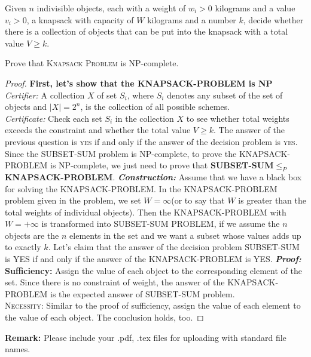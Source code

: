 \documentclass[12pt,a4paper]{article}
\theoremstyle{definition}
\begin{document}
\begin{enumerate}
        Given $n$ indivisible objects, each with a weight of $w_i>0$ kilograms and a value $v_i>0$, a knapsack with capacity of $W$ kilograms and a number $k$, decide whether there is a collection of objects that can be put into the knapsack with a total value $V\geqslant k$.
        
    Prove that \textsc{Knapsack Problem} is NP-complete.
    \begin{proof}
    \textbf{First, let's show that the \textsc{KNAPSACK-PROBLEM} is NP}
    \\
    \textit{Certifier:} A collection $X$ of set $S_i$, where $S_i$ denotes any subset of the set of objects and $|X|=2^n$, is the collection of all possible schemes.
    \\
    \textit{Certificate:} Check each set $S_i$ in the collection $X$ to see whether total weights exceeds the constraint and whether the total value $V\geq k$. The answer of the previous question is \textsc{yes} if and only if the answer of the decision problem is \textsc{yes}.
    \\
	Since the \textsc{SUBSET-SUM} problem is NP-complete, to prove the \textsc{KNAPSACK-PROBLEM} is NP-complete, we just need to prove that \textbf{\textsc{SUBSET-SUM}$\leq_P$\textsc{KNAPSACK-PROBLEM}}.
	\textbf{\textit{Construction:}} Assume that we have a black box for solving the \textsc{KNAPSACK-PROBLEM}. In the \textsc{KNAPSACK-PROBLEM} problem given in the problem, we set $W=\infty$(or to say that $W$ is greater than the total weights of individual objects). Then the \textsc{KNAPSACK-PROBLEM} with $W=+\infty$ is transformed into \textsc{SUBSET-SUM PROBLEM}, if we assume the $n$ objects are the $n$ elements in the set and we want a subset  whose values adds up to exactly $k$. Let's claim that the answer of the decision problem \textsc{SUBSET-SUM} is \textsc{YES} if and only if the answer of the \textsc{KNAPSACK-PROBLEM} is \textsc{YES}.
	\textbf{\textit{Proof:}}
	\\
	\textbf{Sufficiency:} Assign the value of each object to the corresponding element of the set. Since there is no constraint of weight, the answer of the \textsc{KNAPSACK-PROBLEM} is the expected answer of \textsc{SUBSET-SUM} problem.
	\\
	\textsc{Necessity:} Similar to the proof of sufficiency, assign the value of each element to the value of each object. The conclusion holds, too.
	
    \end{proof}
\end{enumerate}


\textbf{Remark:} Please include your .pdf, .tex files for uploading with standard file names.
\newpage


\renewcommand\refname{Reference}
 

\end{document}
